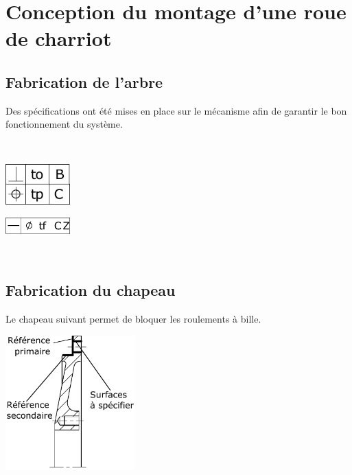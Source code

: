 \section{Conception du montage d'une roue de charriot}

\subsection{Fabrication de l'arbre}

Des spécifications ont été mises en place sur le mécanisme afin de garantir le bon fonctionnement du système.


~\

\begin{minipage}{0.45\linewidth}
\centering\includegraphics[width=2.5cm]{img/specif1}
\end{minipage}\hfill
\begin{minipage}{0.45\linewidth}
\centering\includegraphics[width=2.5cm]{img/specif2}
\end{minipage} ~\ \\

\subsection{Fabrication du chapeau}

Le chapeau suivant permet de bloquer les roulements à bille. ~\ \\

\begin{center}
 \includegraphics[width=5cm]{img/specif3}
\end{center}\hfill

